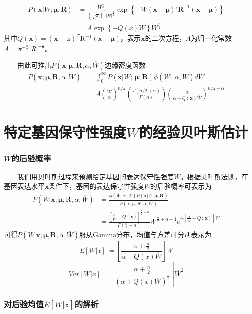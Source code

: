 \documentclass[]{article}
\begin{document}
\[
\begin{align*} 
P\left(\boldsymbol{x}|W;\boldsymbol{\mu,R}\right)&=\frac{W^{\frac{n}{2}}}{\left(\sqrt{\pi}\right)^n\left|R\right|^{\frac{1}{2}}}\exp\left\{-W\left(\boldsymbol{x}-\boldsymbol{\mu}\right)'\boldsymbol{R}^{-1}\left(\boldsymbol{x}-\boldsymbol{\mu}\right)\right\}\\
&=A\exp\left\{-Q\left(x\right)W\right\}W^{\frac{n}{2}}
\end{align*} 
\]
其中\(Q(\boldsymbol{x})=(\boldsymbol{x}-\boldsymbol{\mu})^T\boldsymbol{R}^{-1}(\boldsymbol{x}-\boldsymbol{\mu})\)，表示\(\boldsymbol{x}\)的二次方程，\(A\)为归一化常数\(A=\pi^{-\frac{n}{2}}\left|R\right|^{-\frac{1}{2}}\)。

  由此可推出\(P\left(\boldsymbol{x};\boldsymbol{\mu},\boldsymbol{R},\alpha,\overline{W}\right)\)边缘密度函数
\[
\begin{align*} 
P\left(\boldsymbol{x};\boldsymbol{\mu},\boldsymbol{R},\alpha,\overline{W}\right)&=\int_0^{\infty}P\left(\boldsymbol{x}|W;\  \boldsymbol{\mu};\boldsymbol{R}\right)\phi\left(W;\  \alpha,\overline{W}\right)dW\\
&=A\left(\frac{\overline{W}}{\alpha}\right)^{n/2}\left(\frac{\Gamma\left(n/2+\alpha\right)}{\Gamma\left(\alpha\right)}\right)\left(\frac{\alpha}{\alpha+Q\left(\boldsymbol{x}\right)\overline{W}}\right)^{n/2+\alpha}
\end{align*} 
\]

\hypertarget{w}{%
\section{\texorpdfstring{特定基因保守性强度\(W\)的经验贝叶斯估计}{特定基因保守性强度W的经验贝叶斯估计}}\label{w}}

\hypertarget{w}{%
\subsubsection{\texorpdfstring{\(W\)的后验概率}{W的后验概率}}\label{w}}

  我们用贝叶斯过程来预测给定基因的表达保守性强度\(W\)。根据贝叶斯法则，在基因表达水平\(\boldsymbol{x}\)条件下，基因的表达保守性强度\(W\)的后验概率可表示为
\[
\begin{align*} 
P\left(W|\boldsymbol{x};\boldsymbol{\mu},\boldsymbol{R},\alpha,\overline{W}\right)&=\frac{\phi\left(W;\alpha,\overline{W}\right)P\left(\boldsymbol{x}|W;\boldsymbol{\mu},\boldsymbol{R}\right)}{P\left(\boldsymbol{x};\boldsymbol{\mu},\boldsymbol{R},\alpha,\overline{W}\right)}\\
&=\frac{\left[\frac{\alpha}{\overline{W}}+Q\left(\boldsymbol{x}\right)\right]^{\frac{n}{2}+\alpha}}{\Gamma\left(\frac{n}{2}+\alpha\right)}W^{\frac{n}{2}+\alpha-1}e^{-\left[\frac{\alpha}{\overline{W}}+Q\left(\boldsymbol{x}\right)\right]W}
\end{align*} 
\]
可得\(P\left(W|\boldsymbol{x};\boldsymbol{\mu},\boldsymbol{R},\alpha,\overline{W}\right)\)服从Gamma分布，均值与方差可分别表示为
\[E\left[W|x\right]\  =\left[\frac{\alpha+\frac{n}{2}}{\alpha+Q\left(x\right)\overline{W}}\right]\overline{W}\]
\[Var\left[W|x\right]=\left[\frac{\alpha+\frac{n}{2}}{\left(\alpha+Q\left(x\right)\overline{W}\right)^2}\right]\overline{W}^2\]

\hypertarget{ewboldsymbolx}{%
\subsubsection{\texorpdfstring{对后验均值\(E[W|\boldsymbol{x}]\)的解析}{对后验均值E{[}W\textbar{}\textbackslash{}boldsymbol\{x\}{]}的解析}}\label{ewboldsymbolx}}
\end{document}
